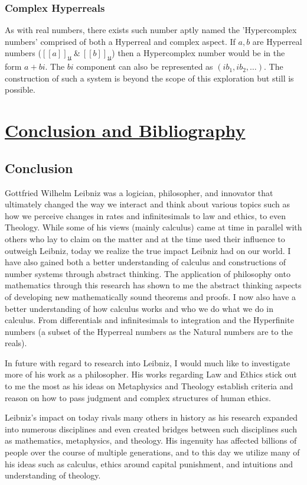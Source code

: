 \documentclass[12pt]{report}
\newcommand{\U}{\mathfrak{U}}
\begin{document}
\section*{Complex Hyperreals}
As with real numbers, there exists such number aptly named the 'Hypercomplex numbers' comprised of both a Hyperreal and complex aspect.
If $ a,b$ are Hyperreal numbers ($[[a]]_{\U} \  \& \  [[b]]_{\U}$) then a Hypercomplex number would be in the form $a+bi$.
The $bi $ component can also be represented as $(ib_1, ib_2,\ldots)$.
The construction of such a system is beyond the scope of this exploration but still is possible.


\part*{\underline{Conclusion and Bibliography}}
\chapter*{Conclusion}
Gottfried Wilhelm Leibniz was a logician, philosopher, and innovator that ultimately changed the way we interact and think about various topics such as how we perceive changes in rates and infinitesimals to law and ethics, to even Theology.
While some of his views (mainly calculus) came at time in parallel with others who lay to claim on the matter and at the time used their influence to outweigh Leibniz, today we realize the true impact Leibniz had on our world.
I have also gained both a better understanding of calculus and constructions of number systems through abstract thinking.
The application of philosophy onto mathematics through this research has shown to me the abstract thinking aspects of developing new mathematically sound theorems and proofs.
I now also have a better understanding of how calculus works and who we do what we do in calculus.
From differentials and infinitesimals to integration and the Hyperfinite numbers (a subset of the Hyperreal numbers as the Natural numbers are to the reals).
\par


In future with regard to research into Leibniz, I would much like to investigate more of his work as a philosopher.
His works regarding Law and Ethics stick out to me the most as his ideas on Metaphysics and Theology establish criteria and reason on how to pass judgment and complex structures of human ethics. \par
Leibniz's impact on today rivals many others in history as his research expanded into numerous disciplines and even created bridges between such disciplines such as mathematics, metaphysics, and theology.
His ingenuity has affected billions of people over the course of multiple generations, and to this day we utilize many of his ideas such as calculus, ethics around capital punishment, and intuitions and understanding of theology.\par \\
\end{document}
